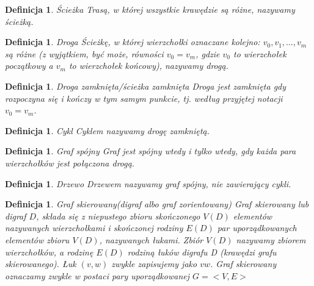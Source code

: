 \documentclass[12pt,a4paper]{report}
\newtheorem{definition}[theorem]{Definicja}
\begin{document}
\begin{definition}{Ścieżka \cite[Rozdział 3]{wilson2008}}
Trasą, w której wszystkie krawędzie są różne, nazywamy ścieżką.
\end{definition}


\begin{definition}{Droga \cite[Rozdział 3]{wilson2008}}
Ścieżkę, w której wierzchołki  oznaczane kolejno: $v_{0}, v_{1}, \ldots, v_{m}$ są różne (z wyjątkiem, być może, równości $v_{0}=v_{m}$, gdzie $v_{0}$ to wierzchołek początkowy a $v_{m}$ to wierzchołek końcowy), nazywamy drogą. 
\end{definition}


\begin{definition}{Droga zamknięta/ścieżka zamknięta \cite[Rozdział 3]{wilson2008}}
Droga jest zamknięta gdy rozpoczyna się i kończy w tym samym punkcie, tj. według przyjętej notacji $v_{0}=v_{m}$.
\end{definition}


\begin{definition}{Cykl \cite[Rozdział 3]{wilson2008}}
Cyklem nazywamy drogę zamkniętą.
\end{definition}


\begin{definition}{Graf spójny \cite[Rozdział 3]{wilson2008}}
Graf jest spójny wtedy i tylko wtedy, gdy każda para wierzchołków jest połączona drogą.
\end{definition}


\begin{definition}{Drzewo \cite[Rozdział 4]{wilson2008}}
Drzewem nazywamy graf spójny, nie zawierający cykli.
\end{definition}

\begin{definition}{Graf skierowany(digraf albo graf zorientowany) \cite[Rozdział 7]{wilson2008}}
Graf skierowany lub digraf $D$, składa się z niepustego zbioru skończonego $V(D)$ elementów nazywanych wierzchołkami i skończonej rodziny $E(D)$ par uporządkowanych elementów zbioru $V(D)$, nazywanych łukami. Zbiór $V(D)$ nazywamy zbiorem wierzchołków, a rodzinę $E(D)$ rodziną łuków digrafu D (krawędzi grafu skierowanego). Łuk $(v,w)$ zwykle zapisujemy jako $vw$. Graf skierowany oznaczamy zwykle w postaci pary uporządkowanej $G=<V,E>$\\
\end{definition}
\end{document}
